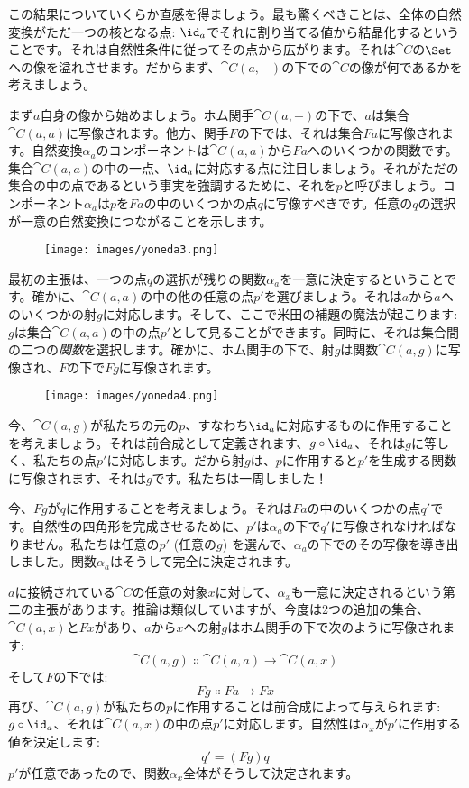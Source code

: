 この結果についていくらか直感を得ましょう。最も驚くべきことは、全体の自然変換がただ一つの核となる点: $\id_a$でそれに割り当てる値から結晶化するということです。それは自然性条件に従ってその点から広がります。それは$\cat{C}$の$\Set$への像を溢れさせます。だからまず、$\cat{C}(a, -)$の下での$\cat{C}$の像が何であるかを考えましょう。

まず$a$自身の像から始めましょう。ホム関手$\cat{C}(a, -)$の下で、$a$は集合$\cat{C}(a, a)$に写像されます。他方、関手$F$の下では、それは集合$F a$に写像されます。自然変換$\alpha_a$のコンポーネントは$\cat{C}(a, a)$から$F a$へのいくつかの関数です。集合$\cat{C}(a, a)$の中の一点、$\id_a$に対応する点に注目しましょう。それがただの集合の中の点であるという事実を強調するために、それを$p$と呼びましょう。コンポーネント$\alpha_a$は$p$を$F a$の中のいくつかの点$q$に写像すべきです。任意の$q$の選択が一意の自然変換につながることを示します。

\begin{figure}[H]
  \centering
  \texttt{[image: images/yoneda3.png]}
\end{figure}

\noindent
最初の主張は、一つの点$q$の選択が残りの関数$\alpha_a$を一意に決定するということです。確かに、$\cat{C}(a, a)$の中の他の任意の点$p'$を選びましょう。それは$a$から$a$へのいくつかの射$g$に対応します。そして、ここで米田の補題の魔法が起こります: $g$は集合$\cat{C}(a, a)$の中の点$p'$として見ることができます。同時に、それは集合間の二つの\emph{関数}を選択します。確かに、ホム関手の下で、射$g$は関数$\cat{C}(a, g)$に写像され、$F$の下で$F g$に写像されます。

\begin{figure}[H]
  \centering
  \texttt{[image: images/yoneda4.png]}
\end{figure}

\noindent
今、$\cat{C}(a, g)$が私たちの元の$p$、すなわち$\id_a$に対応するものに作用することを考えましょう。それは前合成として定義されます、$g \circ \id_a$、それは$g$に等しく、私たちの点$p'$に対応します。だから射$g$は、$p$に作用すると$p'$を生成する関数に写像されます、それは$g$です。私たちは一周しました！

今、$F g$が$q$に作用することを考えましょう。それは$F a$の中のいくつかの点$q'$です。自然性の四角形を完成させるために、$p'$は$\alpha_a$の下で$q'$に写像されなければなりません。私たちは任意の$p'$ (任意の$g$) を選んで、$\alpha_a$の下でのその写像を導き出しました。関数$\alpha_a$はそうして完全に決定されます。

$a$に接続されている$\cat{C}$の任意の対象$x$に対して、$\alpha_x$も一意に決定されるという第二の主張があります。推論は類似していますが、今度は2つの追加の集合、$\cat{C}(a, x)$と$F x$があり、$a$から$x$への射$g$はホム関手の下で次のように写像されます: 
\[\cat{C}(a, g) \Colon \cat{C}(a, a) \to \cat{C}(a, x)\]
そして$F$の下では: 
\[F g \Colon F a \to F x\]
再び、$\cat{C}(a, g)$が私たちの$p$に作用することは前合成によって与えられます: $g \circ \id_a$、それは$\cat{C}(a, x)$の中の点$p'$に対応します。自然性は$\alpha_x$が$p'$に作用する値を決定します: 
\[q' = (F g) q\]
$p'$が任意であったので、関数$\alpha_x$全体がそうして決定されます。

